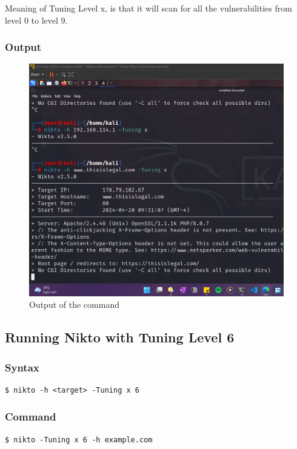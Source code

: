 \documentclass[11pt]{article}
\begin{document}
Meaning of Tuning Level x, is that it will scan for all the vulnerabilities from level 0 to level 9.

\subsubsection*{Output}
\begin{figure}[H]
    \centering
    \includegraphics[width=0.99\textwidth]{assignment 8.png}
    \caption{Output of the command}
\end{figure}

\subsection{Running Nikto with Tuning Level 6}

\subsubsection*{Syntax}
\begin{verbatim}
$ nikto -h <target> -Tuning x 6
\end{verbatim}

\subsubsection*{Command}
\begin{verbatim}
$ nikto -Tuning x 6 -h example.com
\end{verbatim}
\end{document}
